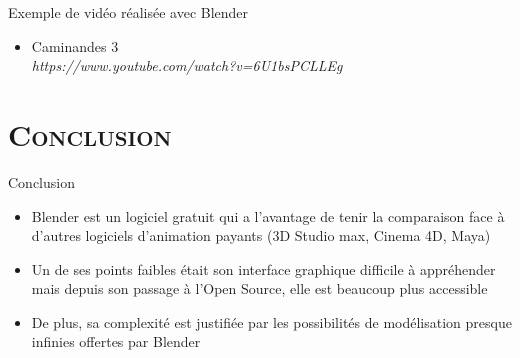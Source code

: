\documentclass[xcolor=x11names,compress]{beamer}
\renewcommand{\(}{\begin{columns}}
\renewcommand{\)}{\end{columns}}
\newcommand{\<}[1]{\begin{column}{#1}}
\renewcommand{\>}{\end{column}}
\begin{document}
\begin{frame}{Exemple de vidéo réalisée avec Blender}
    \begin{itemize}
        \item Caminandes 3\\
        \textit{https://www.youtube.com/watch?v=6U1bsPCLLEg}
    \end{itemize}
\end{frame}

\section{\scshape Conclusion}
\begin{frame}{Conclusion}
    \begin{itemize}
        \item Blender est un logiciel gratuit qui a l'avantage de tenir la comparaison face à d'autres logiciels d'animation payants (3D Studio max, Cinema 4D, Maya)\\
        \item Un de ses points faibles était son interface graphique difficile à appréhender mais depuis son passage à l'Open Source, elle est beaucoup plus accessible
        \item De plus, sa complexité est justifiée par les possibilités de modélisation presque infinies offertes par Blender
    \end{itemize}
\end{frame}
\end{document}
